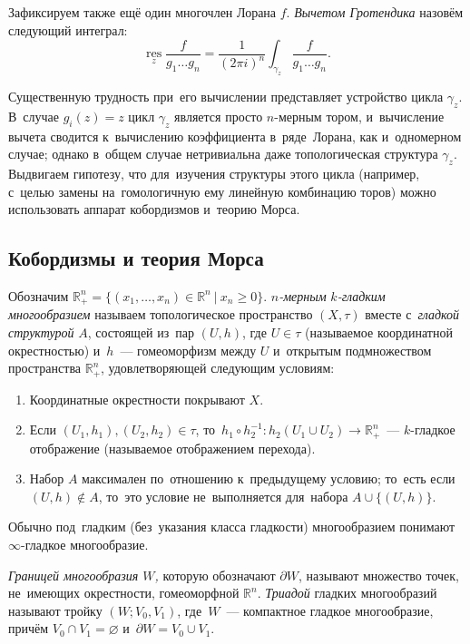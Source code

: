 \documentclass[a4paper,oneside]{article}
\begin{document}
Зафиксируем также ещё один многочлен Лорана $f$. \textit{Вычетом Гротендика} назовём следующий интеграл:
\[
  \operatorname*{res}\limits_{z} \frac{f}{g_1 \ldots g_n} = \frac{1}{(2 \pi i)^n} \int_{\gamma_z} \frac{f}{g_1 \ldots g_n}.
\]

Существенную трудность \cite{Tsikh92} при~его вычислении представляет устройство цикла $\gamma_z$.
В~случае $g_i(z) = z$ цикл $\gamma_z$ является просто $n$-мерным тором, и~вычисление вычета
сводится к~вычислению коэффициента в~ряде~Лорана, как и~одномерном случае; однако в~общем случае
нетривиальна даже топологическая структура $\gamma_z$. Выдвигаем гипотезу, что для~изучения
структуры этого цикла (например, с~целью замены на~гомологичную ему линейную комбинацию торов)
можно использовать аппарат кобордизмов и~теорию Морса.

\subsection{Кобордизмы и теория Морса}
Обозначим $\mathbb{R}^n_+ = \{ (x_1, \ldots, x_n) \in \mathbb{R}^n\ |\ x_n \geq 0 \}$.
\textit{$n$-мерным} \textit{$k$-гладким} \textit{многообразием} называем топологическое пространство $(X, \tau)$
вместе с~\textit{гладкой структурой} $A$, состоящей из~пар $(U, h)$, где $U \in \tau$
(называемое координатной окрестностью) и~$h$~— гомеоморфизм между $U$ и~открытым
подмножеством пространства $\mathbb{R}^n_+$, удовлетворяющей следующим условиям:
\begin{enumerate}
  \item Координатные окрестности покрывают $X$.
  \item Если $(U_1, h_1), (U_2, h_2) \in \tau$, то~$h_1 \circ h_2^{-1} : h_2(U_1 \cup U_2) \rightarrow \mathbb{R}^n_+$~— $k$-гладкое отображение
        (называемое отображением перехода).
  \item Набор $A$ максимален по~отношению к~предыдущему условию; то~есть если $(U, h) \notin A$,
  то~это условие не~выполняется для~набора $A \cup \{(U, h)\}$.
\end{enumerate}

Обычно под~гладким (без~указания класса гладкости) многообразием понимают $\infty$-гладкое многообразие.

\textit{Границей многообразия $W$,} которую обозначают $\partial W$, называют множество точек,
не~имеющих окрестности, гомеоморфной $\mathbb{R}^n$. \textit{Триадой} гладких многообразий \cite{Mil65} называют
тройку $(W; V_0, V_1)$, где~$W$~— компактное гладкое многообразие, причём $V_0 \cap V_1 = \varnothing$
и~$\partial W = V_0 \cup V_1$.
\end{document}
